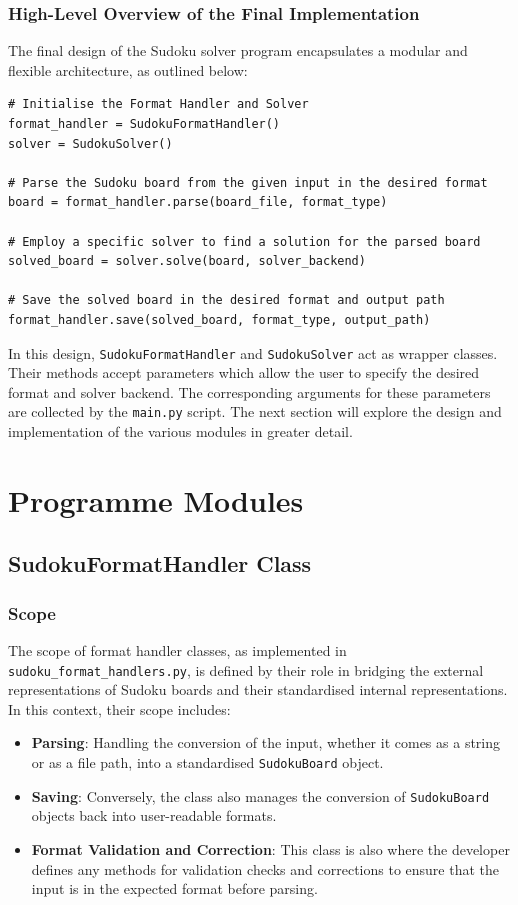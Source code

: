 \documentclass[11pt]{article}
\begin{document}
\subsubsection{High-Level Overview of the Final Implementation}
The final design of the Sudoku solver program encapsulates a modular and flexible architecture, as outlined below:

\begin{verbatim}
# Initialise the Format Handler and Solver
format_handler = SudokuFormatHandler()
solver = SudokuSolver()

# Parse the Sudoku board from the given input in the desired format
board = format_handler.parse(board_file, format_type)

# Employ a specific solver to find a solution for the parsed board 
solved_board = solver.solve(board, solver_backend)

# Save the solved board in the desired format and output path
format_handler.save(solved_board, format_type, output_path)
\end{verbatim}

In this design, \texttt{SudokuFormatHandler} and \texttt{SudokuSolver} act as wrapper classes. Their methods accept parameters which allow the user to specify the desired format and solver backend. The corresponding arguments for these parameters are collected by the \texttt{main.py} script. The next section will explore the design and implementation of the various modules in greater detail.

\section{Programme Modules}
\subsection{SudokuFormatHandler Class}

\subsubsection{Scope}
The scope of format handler classes, as implemented in \texttt{sudoku\_format\_handlers.py}, is defined by their role in bridging the external representations of Sudoku boards and their standardised internal representations. In this context, their scope includes:

\begin{itemize}
\item \textbf{Parsing}: Handling the conversion of the input, whether it comes as a string or as a file path, into a standardised \texttt{SudokuBoard} object.

\item \textbf{Saving}: Conversely, the class also manages the conversion of \texttt{SudokuBoard} objects back into user-readable formats. 

\item \textbf{Format Validation and Correction}: This class is also where the developer defines any methods for validation checks and corrections to ensure that the input is in the expected format before parsing.
\end{itemize}
\end{document}
